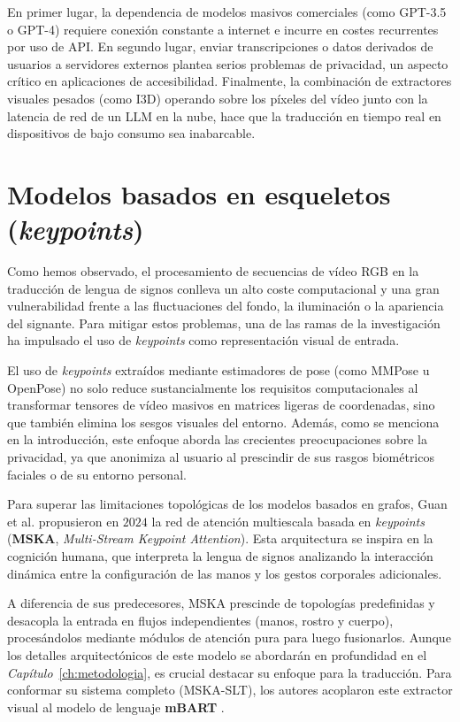 En primer lugar, la dependencia de modelos masivos comerciales (como GPT-3.5 o GPT-4) requiere conexión constante a internet e incurre en costes recurrentes por uso de API.
En segundo lugar, enviar transcripciones o datos derivados de usuarios a servidores externos plantea serios problemas de privacidad, un aspecto crítico en aplicaciones de accesibilidad.
Finalmente, la combinación de extractores visuales pesados (como I3D) operando sobre los píxeles del vídeo junto con la latencia de red de un LLM en la nube, hace que la traducción en tiempo real en dispositivos de bajo consumo sea inabarcable.


\section{Modelos basados en esqueletos (\textit{keypoints})}
Como hemos observado, el procesamiento de secuencias de vídeo RGB en la traducción de lengua de signos conlleva un alto coste computacional y una gran vulnerabilidad frente a las fluctuaciones del fondo, la iluminación o la apariencia del signante.
Para mitigar estos problemas, una de las ramas de la investigación ha impulsado el uso de \textit{keypoints} como representación visual de entrada.

El uso de \textit{keypoints} extraídos mediante estimadores de pose (como MMPose u OpenPose) no solo reduce sustancialmente los requisitos computacionales al transformar tensores de vídeo masivos en matrices ligeras de coordenadas, sino que también elimina los sesgos visuales del entorno.
Además, como se menciona en la introducción, este enfoque aborda las crecientes preocupaciones sobre la privacidad, ya que anonimiza al usuario al prescindir de sus rasgos biométricos faciales o de su entorno personal.

Para superar las limitaciones topológicas de los modelos basados en grafos, Guan et al. \cite{MSKA} propusieron en $2024$ la red de atención multiescala basada en \textit{keypoints} (\textbf{MSKA}, \textit{Multi-Stream Keypoint Attention}).
Esta arquitectura se inspira en la cognición humana, que interpreta la lengua de signos analizando la interacción dinámica entre la configuración de las manos y los gestos corporales adicionales.

A diferencia de sus predecesores, MSKA prescinde de topologías predefinidas y desacopla la entrada en flujos independientes (manos, rostro y cuerpo), procesándolos mediante módulos de atención pura para luego fusionarlos.
Aunque los detalles arquitectónicos de este modelo se abordarán en profundidad en el \textit{Capítulo}~\ref{ch:metodologia}, es crucial destacar su enfoque para la traducción.
Para conformar su sistema completo (MSKA-SLT), los autores acoplaron este extractor visual al modelo de lenguaje \textbf{mBART} \cite{mBART}.

